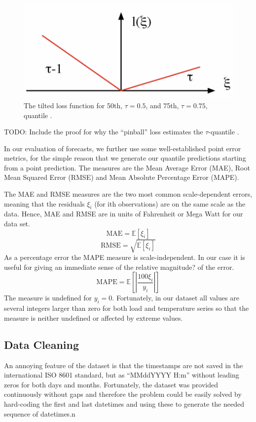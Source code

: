 \documentclass[conference]{IEEEtran}
\begin{document}
\begin{figure}[ht!]
\centering
\includegraphics[width=\linewidth]{gfx/pinball.pdf}
\caption{The tilted loss function for 50th, $\tau=0.5$, and 75th, $\tau=0.75$, quantile \cite{Takeuchi2005}.}
\label{fig:pinball}
\end{figure}
TODO: Include the proof for why the ``pinball'' loss estimates the $\tau$-quantile \cite{Takeuchi2005}.\par
In our evaluation of forecasts, we further use some well-established point error metrics, for the simple reason that we generate our quantile predictions starting from a point prediction. The measures are the Mean Average Error (MAE), Root Mean Squared Error (RMSE) and Mean Absolute Percentage Error (MAPE).\par
The MAE and RMSE measures are the two most common scale-dependent errors, meaning that the residuals $\xi_i$ (for ith observations) are on the same scale as the data. Hence, MAE and RMSE are in units of Fahrenheit or Mega Watt for our data set. 
\[
  \text{MAE}=\mathbb{E}[\xi_i]
\]
\[
  \text{RMSE}=\sqrt{\mathbb{E}[\xi_i]}
\]
As a percentage error the MAPE measure is scale-independent. In our case it is useful for giving an immediate sense of the relative magnitude? of the error.
\[
  \text{MAPE}=\mathbb{E}\left[\left| \frac{100\xi_i}{y_i} \right|\right]
\]
The measure is undefined for $y_i=0$. Fortunately, in our dataset all values are several integers larger than zero for both load and temperature series so that the measure is neither undefined or affected by extreme values.

\subsection{Data Cleaning}
An annoying feature of the dataset is that the timestamps are not saved in the international ISO 8601 standard, but as ``MMddYYYY H:m'' without leading zeros for both days and months. Fortunately, the dataset was provided continuously without gaps and therefore the problem could be easily solved by hard-coding the first and last datetimes and using these to generate the needed sequence of datetimes.n
\end{document}
